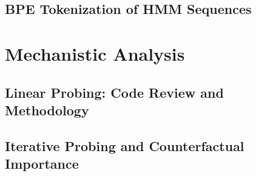 \documentclass[11pt]{report}
\begin{document}
\chapter{BPE Tokenization of HMM Sequences}


\part{Mechanistic Analysis}

\chapter{Linear Probing: Code Review and Methodology}


\chapter{Iterative Probing and Counterfactual Importance}

\end{document}
